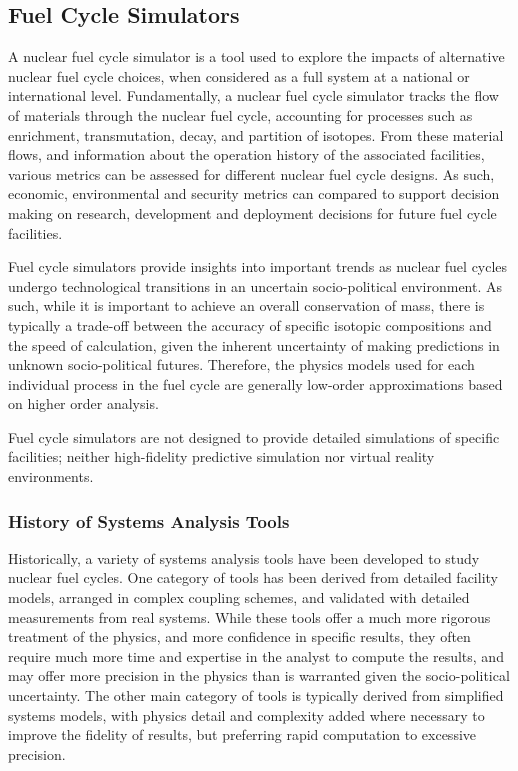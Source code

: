 \documentclass[letterpaper,10pt,english]{sphinxmanual}
\begin{document}
\subsection{Fuel Cycle Simulators}
\label{basics/fcs_background:fuel-cycle-simulators}\label{basics/fcs_background::doc}
A nuclear fuel cycle simulator is a tool used to explore the impacts
of alternative nuclear fuel cycle choices, when considered as a full
system at a national or international level.  Fundamentally, a nuclear
fuel cycle simulator tracks the flow of materials through the nuclear
fuel cycle, accounting for processes such as enrichment,
transmutation, decay, and partition of isotopes.  From these material
flows, and information about the operation history of the associated
facilities, various metrics can be assessed for different nuclear fuel
cycle designs.  As such, economic, environmental and security metrics
can compared to support decision making on research, development and
deployment decisions for future fuel cycle facilities.

Fuel cycle simulators provide insights into important trends as
nuclear fuel cycles undergo technological transitions in an uncertain
socio-political environment.  As such, while it is important to
achieve an overall conservation of mass, there is typically a
trade-off between the accuracy of specific isotopic compositions and
the speed of calculation, given the inherent uncertainty of making
predictions in unknown socio-political futures.  Therefore, the
physics models used for each individual process in the fuel cycle are
generally low-order approximations based on higher order analysis.

Fuel cycle simulators are not designed to provide detailed simulations
of specific facilities; neither high-fidelity predictive simulation nor
virtual reality environments.


\subsubsection{History of Systems Analysis Tools}
\label{basics/fcs_background:history-of-systems-analysis-tools}
Historically, a variety of systems analysis tools have been developed
to study nuclear fuel cycles.  One category of tools has been derived
from detailed facility models, arranged in complex coupling schemes,
and validated with detailed measurements from real systems.  While
these tools offer a much more rigorous treatment of the physics, and
more confidence in specific results, they often require much more time
and expertise in the analyst to compute the results, and may offer
more precision in the physics than is warranted given the
socio-political uncertainty.  The other main category of tools is
typically derived from simplified systems models, with physics detail
and complexity added where necessary to improve the fidelity of
results, but preferring rapid computation to excessive precision.
\end{document}
